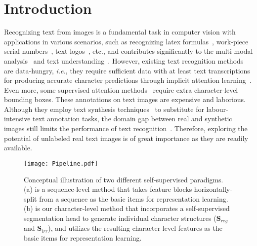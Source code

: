 \documentclass[10pt,twocolumn,letterpaper]{article}
\begin{document}
\section{Introduction}

Recognizing text from images is a fundamental task in computer vision with applications in various scenarios, such as recognizing latex formulas~\cite{Latex}, work-piece serial numbers~\cite{guan2021industrial}, text logos~\cite{Logo}, etc., and contributes significantly to the multi-modal analysis~\cite{multimodal} and text understanding~\cite{TAP,TextVQA}.
However, existing text recognition methods~\cite{wan2020textscanner,ABINET:fang2021read,DAN:wang2020decoupled,ConCLR,MGP,SATRN:lee2020recognizing,S_GTR} are data-hungry, \emph{i.e.}, they require sufficient data with at least text transcriptions for producing accurate character predictions through implicit attention learning~\cite{guan2022glyph}. Even more, some supervised attention methods~\cite{S_GTR,wan2020textscanner,liao2019scene} require extra character-level bounding boxes. These annotations on text images are expensive and laborious. Although they employ text synthesis techniques~\cite{ST:gupta2016synthetic,MJ:jaderberg2014synthetic} to substitute for labour-intensive text annotation tasks, the domain gap between real and synthetic images still limits the performance of text recognition~\cite{DiG}. Therefore, exploring the potential of unlabeled real text images is of great importance as they are readily available.

\begin{figure}[t]
  \centering
  \graphicspath{{./graph/}}
  \texttt{[image: Pipeline.pdf]}
  \caption{Conceptual illustration of two different self-supervised paradigms. 
  (a) is a sequence-level method that takes feature blocks horizontally-split from a sequence as the basic items for representation learning. (b) is our character-level method that incorporates a self-supervised segmentation head to generate individual character structures ($\mathbf{S}_{reg}$ and $\mathbf{S}_{irr}$), and utilizes the resulting character-level features as the basic items for representation learning.
    }
  \label{Figs.overview}
  \vspace{-1.2em}
\end{figure}
\end{document}
